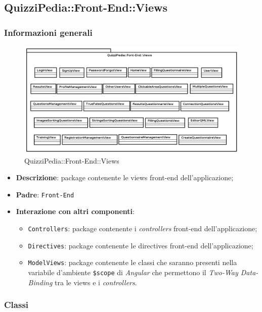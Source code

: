 \newpage

\subsection{QuizziPedia::Front-End::Views}
\subsubsection{Informazioni generali}
\label{QuizziPedia::Front-End::Views}
\begin{figure}[ht]
	\centering
	\includegraphics[scale=0.45]{UML/Package/QuizziPedia_Front-End_Views.png}
	\caption{QuizziPedia::Front-End::Views}
\end{figure}\FloatBarrier
\begin{itemize}
	\item \textbf{Descrizione}: package contenente le views front-end dell'applicazione;
	\item \textbf{Padre}: \texttt{Front-End}
	\item \textbf{Interazione con altri componenti}:
	\begin{itemize}
		\item \texttt{Controllers}: package contenente i \textit{controllers} front-end dell'applicazione;
		\item \texttt{Directives}: package contenente le directives front-end dell'applicazione;
		\item \texttt{ModelViews}: package contenente le classi che saranno presenti nella variabile d'ambiente \texttt{\$scope} di \textit{Angular} che permettono il \textit{Two-Way Data-Binding} tra le views e i \textit{controllers}.
	\end{itemize}
\end{itemize}
\subsubsection{Classi}

